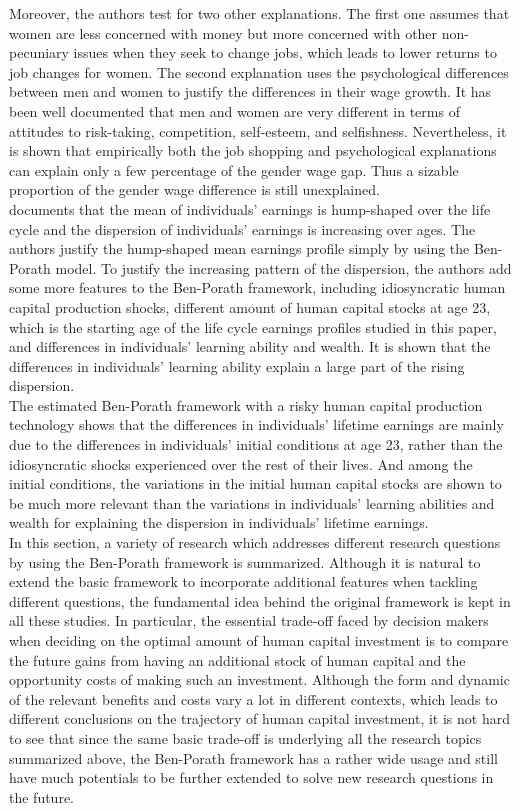 \indent Moreover, the authors test for two other explanations. The first one assumes that women are less concerned with money but more concerned with other non-pecuniary issues when they seek to change jobs, which leads to lower returns to job changes for women. The second explanation uses the psychological differences between men and women to justify the differences in their wage growth. It has been well documented that men and women are very different in terms of attitudes to risk-taking, competition, self-esteem, and selfishness. Nevertheless, it is shown that empirically both the job shopping and psychological explanations can explain only a few percentage of the gender wage gap. Thus a sizable proportion of the gender wage difference is still unexplained.\\
\indent \citet{Huggett2011sources} documents that the mean of individuals' earnings is hump-shaped over the life cycle and the dispersion of individuals' earnings is increasing over ages. The authors justify the hump-shaped mean earnings profile simply by using the Ben-Porath model. To justify the increasing pattern of the dispersion, the authors add some more features to the Ben-Porath framework, including idiosyncratic human capital production shocks, different amount of human capital stocks at age 23, which is the starting age of the life cycle earnings profiles studied in this paper, and differences in individuals' learning ability and wealth. It is shown that the differences in individuals' learning ability explain a large part of the rising dispersion.\\
\indent The estimated Ben-Porath framework with a risky human capital production technology shows that the differences in individuals' lifetime earnings are mainly due to the differences in individuals' initial conditions at age 23, rather than the idiosyncratic shocks experienced over the rest of their lives. And among the initial conditions, the variations in the initial human capital stocks are shown to be much more relevant than the variations in individuals' learning abilities and wealth for explaining the dispersion in individuals' lifetime earnings. \\
\indent In this section, a variety of research which addresses different research questions by using the Ben-Porath framework is summarized. Although it is natural to extend the basic framework to incorporate additional features when tackling different questions, the fundamental idea behind the original framework is kept in all these studies. In particular, the essential trade-off faced by decision makers when deciding on the optimal amount of human capital investment is to compare the future gains from having an additional stock of human capital and the opportunity costs of making such an investment. Although the form and dynamic of the relevant benefits and costs vary a lot in different contexts, which leads to different conclusions on the trajectory of human capital investment, it is not hard to see that since the same basic trade-off is underlying all the research topics summarized above, the Ben-Porath framework has a rather wide usage and still have much potentials to be further extended to solve new research questions in the future. \\